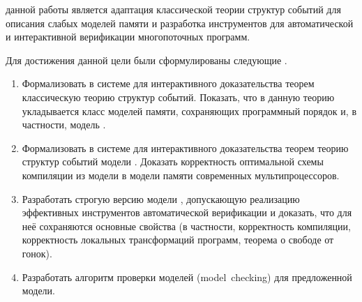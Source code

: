 

{\aim} данной работы является адаптация классической теории структур событий
для описания слабых моделей памяти и разработка  
инструментов для автоматической и интерактивной верификации многопоточных программ. 

Для достижения данной цели были сформулированы следующие {\tasks}.
\begin{enumerate}[beginpenalty=10000] %
  \item
    Формализовать в системе для интерактивного доказательства теорем \coq
    классическую теорию структур событий. Показать, что
    в данную теорию укладывается класс моделей памяти,
    сохраняющих программный порядок и, в частности, модель \RCMM.
  \item
    Формализовать в системе для интерактивного доказательства теорем \coq
    теорию структур событий модели \Wkm.
    Доказать корректность оптимальной схемы компиляции
    из модели \Wkm в модели памяти современных мультипроцессоров.
  \item
    Разработать строгую версию модели \Wkm, 
    допускающую реализацию эффективных инструментов автоматической верификации
    и доказать, что для неё сохраняются основные свойства \Wkm  
    (в частности, корректность компиляции, корректность локальных трансформаций программ, 
     теорема о свободе от гонок).
  \item
    Разработать алгоритм проверки моделей (model~checking) для предложенной модели.
\end{enumerate}

